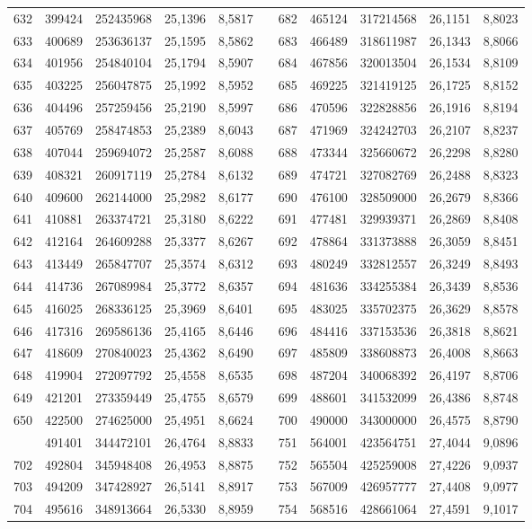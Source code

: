 \begin{longtable}{rrrrrrrrrrr}
632&399424&252435968&25,1396&8,5817&&682&465124&317214568&26,1151&8,8023\\
633&400689&253636137&25,1595&8,5862&&683&466489&318611987&26,1343&8,8066\\
634&401956&254840104&25,1794&8,5907&&684&467856&320013504&26,1534&8,8109\\
635&403225&256047875&25,1992&8,5952&&685&469225&321419125&26,1725&8,8152\\
636&404496&257259456&25,2190&8,5997&&686&470596&322828856&26,1916&8,8194\\
637&405769&258474853&25,2389&8,6043&&687&471969&324242703&26,2107&8,8237\\
638&407044&259694072&25,2587&8,6088&&688&473344&325660672&26,2298&8,8280\\
639&408321&260917119&25,2784&8,6132&&689&474721&327082769&26,2488&8,8323\\
640&409600&262144000&25,2982&8,6177&&690&476100&328509000&26,2679&8,8366\\
641&410881&263374721&25,3180&8,6222&&691&477481&329939371&26,2869&8,8408\\
642&412164&264609288&25,3377&8,6267&&692&478864&331373888&26,3059&8,8451\\
643&413449&265847707&25,3574&8,6312&&693&480249&332812557&26,3249&8,8493\\
644&414736&267089984&25,3772&8,6357&&694&481636&334255384&26,3439&8,8536\\
645&416025&268336125&25,3969&8,6401&&695&483025&335702375&26,3629&8,8578\\
646&417316&269586136&25,4165&8,6446&&696&484416&337153536&26,3818&8,8621\\
647&418609&270840023&25,4362&8,6490&&697&485809&338608873&26,4008&8,8663\\
648&419904&272097792&25,4558&8,6535&&698&487204&340068392&26,4197&8,8706\\
649&421201&273359449&25,4755&8,6579&&699&488601&341532099&26,4386&8,8748\\
650&422500&274625000&25,4951&8,6624&&700&490000&343000000&26,4575&8,8790\\
\newpage
701&491401&344472101&26,4764&8,8833&&751&564001&423564751&27,4044&9,0896\\
702&492804&345948408&26,4953&8,8875&&752&565504&425259008&27,4226&9,0937\\
703&494209&347428927&26,5141&8,8917&&753&567009&426957777&27,4408&9,0977\\
704&495616&348913664&26,5330&8,8959&&754&568516&428661064&27,4591&9,1017\\

\end{longtable}
